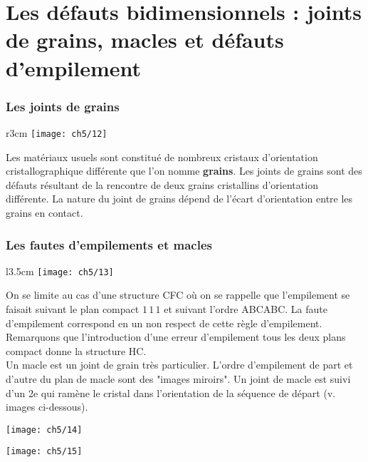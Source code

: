 \section{Les défauts bidimensionnels : joints de grains, macles et défauts d'empilement}
	\subsubsection{Les joints de grains}
		\begin{wrapfigure}[6]{r}{3cm}
		\vspace{-5mm}
		\texttt{[image: ch5/12]}
		\end{wrapfigure}
		Les matériaux usuels sont constitué de nombreux cristaux d'orientation cristallographique différente que l'on nomme \textbf{grains}. Les joints de grains sont des défauts résultant de la rencontre de deux grains cristallins d'orientation différente. La nature du joint de grains dépend de l'écart d'orientation entre les grains en contact. 
		
		\subsubsection{Les fautes d'empilements et macles}
			\begin{wrapfigure}[8]{l}{3.5cm}
		\vspace{-5mm}
		\texttt{[image: ch5/13]}
		\end{wrapfigure}
		On se limite au cas d'une structure CFC où on se rappelle que l'empilement se faisait suivant le plan compact ${1\, 1\, 1}$ et suivant l'ordre ABCABC. La faute d'empilement correspond en un non respect de cette règle d'empilement. Remarquons que l'introduction d'une erreur d'empilement tous les deux plans compact donne la structure HC. \\
		Un macle est un joint de grain très particulier. L'ordre d'empilement de part et d'autre du plan de macle sont des "images miroirs". Un joint de macle est suivi d'un 2e qui ramène le cristal dans l'orientation de la séquence de départ (v. images ci-dessous).\\
		
		\begin{minipage}{0.45\textwidth}
		\begin{flushright}
		\texttt{[image: ch5/14]}
		\end{flushright}
		\end{minipage}
		\begin{minipage}{0.5\textwidth}
		\begin{flushleft}
		\texttt{[image: ch5/15]}
		\end{flushleft}
		\end{minipage}